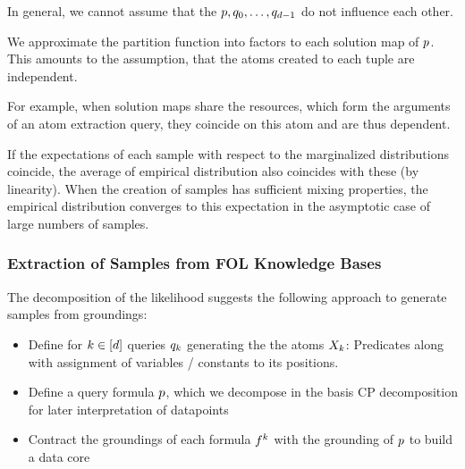In general, we cannot assume that the $p,q_{0},\ldots,q_{d-1}$ do not influence each other.

We approximate the partition function into factors to each solution map of $p$.
This amounts to the assumption, that the atoms created to each tuple are independent.

%
For example, when solution maps share the resources, which form the arguments of an atom extraction query, they coincide on this atom and are thus dependent.

% 
If the expectations of each sample with respect to the marginalized distributions coincide, the average of empirical distribution also coincides with these (by linearity).
When the creation of samples has sufficient mixing properties, the empirical distribution converges to this expectation in the asymptotic case of large numbers of samples.

% 









\subsubsection{Extraction of Samples from FOL Knowledge Bases}

The decomposition of the likelihood suggests the following approach to generate samples from groundings:
\begin{itemize}
	\item Define for $k\in[d]$ queries $q_{k}$ generating the the atoms $X_{k}$: 
	Predicates along with assignment of variables / constants to its positions.
	\item Define a query formula $p$, which we decompose in the basis CP decomposition for later interpretation of datapoints
	\item Contract the groundings of each formula $f^{k}$ with the grounding of $p$ to build a data core
\end{itemize}









